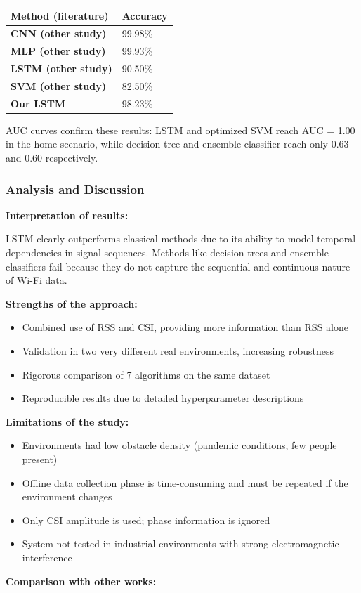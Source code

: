 \documentclass{ipgpmaster}
\begin{document}
\begin{table}
\centering

\begin{tabular}{| l | l |}
\hline
Method (literature) & Accuracy \\
\hline
\textbf{CNN (other study)} & 99.98\% \\
\hline
\textbf{MLP (other study)} & 99.93\% \\
\hline
\textbf{LSTM (other study)} & 90.50\% \\
\hline
\textbf{SVM (other study)} & 82.50\% \\
\hline
\textbf{Our LSTM} & 98.23\% \\
\hline

\end{tabular}

\end{table}

AUC curves confirm these results: LSTM and optimized SVM reach AUC = 1.00 in the home scenario, while decision tree and ensemble classifier reach only 0.63 and 0.60 respectively.

\subsubsection{\textbf{Analysis and Discussion}}

\textbf{Interpretation of results:}

 LSTM clearly outperforms classical methods due to its ability to model temporal dependencies in signal sequences. Methods like decision trees and ensemble classifiers fail because they do not capture the sequential and continuous nature of Wi-Fi data.

\textbf{Strengths of the approach:}

\begin{itemize}
    \item Combined use of RSS and CSI, providing more information than RSS alone 
    \item Validation in two very different real environments, increasing robustness 
    \item Rigorous comparison of 7 algorithms on the same dataset 
    \item Reproducible results due to detailed hyperparameter descriptions 
\end{itemize}
\textbf{Limitations of the study:}

\begin{itemize}
    \item Environments had low obstacle density (pandemic conditions, few people present) 
    \item Offline data collection phase is time-consuming and must be repeated if the environment changes 
    \item Only CSI amplitude is used; phase information is ignored 
    \item System not tested in industrial environments with strong electromagnetic interference 
\end{itemize}
\textbf{Comparison with other works:}
\end{document}
